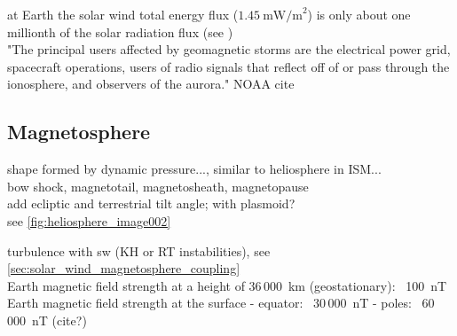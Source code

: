 at Earth the solar wind total energy flux ($1.45~\text{mW/m}^2$) is only about one millionth of the solar radiation flux (see \citet[p.~153]{Schwenn1990})\\

"The principal users affected by geomagnetic storms are the electrical power grid, spacecraft operations, users of radio signals that reflect off of or pass through the ionosphere, and observers of the aurora." NOAA cite\\

\subsection{Magnetosphere}
\label{sec:magnetosphere}

shape formed by dynamic pressure..., similar to heliosphere in ISM...\\

bow shock, magnetotail, magnetosheath, magnetopause\\
add ecliptic and terrestrial tilt angle; with plasmoid?\\
see \autoref{fig:heliosphere_image002}\\
\begin{figure}[htb]
\end{figure}

turbulence with sw (KH or RT instabilities), see \autoref{sec:solar_wind_magnetosphere_coupling}\\

Earth magnetic field strength at a height of 36\,000~km (geostationary): ~100~nT\\
Earth magnetic field strength at the surface - equator: ~30\,000~nT - poles: ~60\,000~nT (cite?)\\

